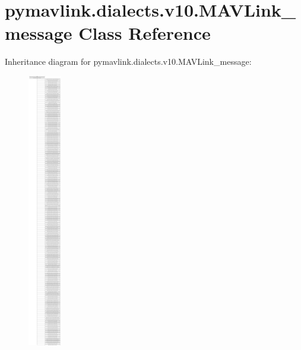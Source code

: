 \hypertarget{classpymavlink_1_1dialects_1_1v10_1_1MAVLink__message}{}\section{pymavlink.\+dialects.\+v10.\+M\+A\+V\+Link\+\_\+message Class Reference}
\label{classpymavlink_1_1dialects_1_1v10_1_1MAVLink__message}
Inheritance diagram for pymavlink.\+dialects.\+v10.\+M\+A\+V\+Link\+\_\+message\+:\begin{figure}[H]
\begin{center}
\leavevmode
\includegraphics[height=12.000000cm]{classpymavlink_1_1dialects_1_1v10_1_1MAVLink__message}
\end{center}
\end{figure}
